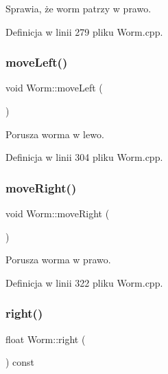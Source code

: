 Sprawia, że worm patrzy w prawo. 



Definicja w linii 279 pliku Worm.\+cpp.

\mbox{\label{class_worm_a93d02457a10bbbfc1d2028168419ecb8}} 
\subsubsection{\texorpdfstring{move\+Left()}{moveLeft()}}
{\footnotesize\ttfamily void Worm\+::move\+Left (\begin{DoxyParamCaption}{ }\end{DoxyParamCaption})}



Porusza worma w lewo. 



Definicja w linii 304 pliku Worm.\+cpp.

\mbox{\label{class_worm_a6d4b33910c18b0e266e310d9b5512d75}} 
\subsubsection{\texorpdfstring{move\+Right()}{moveRight()}}
{\footnotesize\ttfamily void Worm\+::move\+Right (\begin{DoxyParamCaption}{ }\end{DoxyParamCaption})}



Porusza worma w prawo. 



Definicja w linii 322 pliku Worm.\+cpp.

\mbox{\label{class_worm_a52905b36980b4aa37fe1b004df9edc0e}} 
\subsubsection{\texorpdfstring{right()}{right()}}
{\footnotesize\ttfamily float Worm\+::right (\begin{DoxyParamCaption}{ }\end{DoxyParamCaption}) const}



